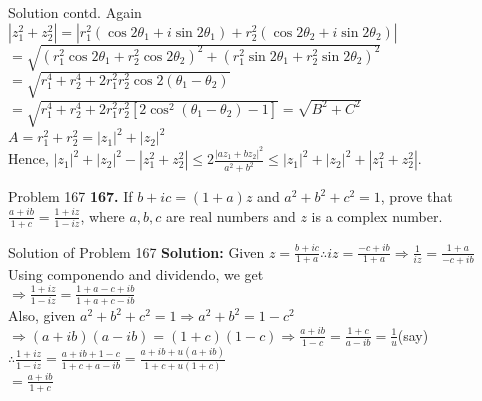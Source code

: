 \documentclass[aspectratio=169,8pt]{beamer}
\begin{document}
\begin{frame}{Solution contd.}
  Again $|z_1^2 + z_2^2| = |r_1^2(\cos2\theta_1 + i\sin2\theta_1) + r_2^2(\cos2\theta_2 + i\sin2\theta_2)|$\\
  \vspace*{0.2cm}
  $= \sqrt{(r_1^2\cos2\theta_1 + r_2^2\cos2\theta_2)^2 + (r_1^2\sin2\theta_1 + r_2^2\sin2\theta_2)^2}$\\
  \vspace*{0.2cm}
  $= \sqrt{r_1^4 + r_2^4 + 2r_1^2r_2^2\cos2(\theta_1 - \theta_2)}$\\
  \vspace*{0.2cm}
  $= \sqrt{r_1^4 + r_2^4 + 2r_1^2r_2^2[2\cos^2(\theta_1 - \theta_2) - 1]} = \sqrt{B^2 + C^2}$\\
  \vspace*{0.2cm}
  $A = r_1^2 + r_2^2 = |z_1|^2 + |z_2|^2$\\
  \vspace*{0.2cm}
  Hence, $|z_1|^2 + |z_2|^2 - |z_1^2 + z_2^2| \leq 2\frac{|az_1 + bz_2|^2}{a^2 + b^2}\leq |z_1|^2 + |z_2|^2 + |z_1^2 + z_2^2|$.
\end{frame}
\begin{frame}{Problem 167}
  \textbf{167.} If $b + ic = (1 + a)z$ and $a^2 + b^2 + c^2 = 1$, prove that $\frac{a + ib}{1 + c} = \frac{1 + iz}{1 - iz}$, where
  $a, b,c$ are real numbers and $z$ is a complex number.
\end{frame}
\begin{frame}{Solution of Problem 167}
  \textbf{Solution:} Given $z = \frac{b + ic}{1 + a} \therefore iz = \frac{-c + ib}{1 + a} \Rightarrow \frac{1}{iz} = \frac{1 +
    a}{-c + ib}$\\
  \vspace*{0.2cm}
  Using componendo and dividendo, we get\\
  \vspace*{0.2cm}
  $\Rightarrow \frac{1 + iz}{1 - iz} = \frac{1 + a - c + ib}{1 + a + c - ib}$\\
  \vspace*{0.2cm}
  Also, given $a^2 + b^2 + c^2 = 1 \Rightarrow a^2 + b^2 = 1 - c^2$\\
  \vspace*{0.2cm}
  $\Rightarrow (a + ib)(a - ib) = (1 + c)(1 - c)\Rightarrow \frac{a + ib}{1 - c} = \frac{1 + c}{a - ib} = \frac{1}{u}$(say)\\
  \vspace*{0.2cm}
  $\therefore \frac{1 + iz}{1 - iz} = \frac{a + ib + 1 - c}{1 + c + a - ib} = \frac{a + ib + u(a + ib)}{1 + c + u(1 + c)}$\\
  \vspace*{0.2cm}
  $= \frac{a + ib}{1 + c}$
\end{frame}
\end{document}
